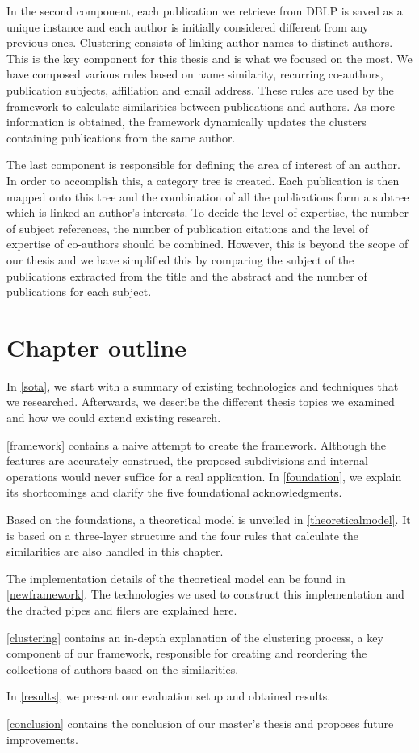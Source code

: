 In the second component, each publication we retrieve from DBLP is saved as a unique instance and each author is initially considered different from any previous ones. Clustering consists of linking author names to distinct authors. This is the key component for this thesis and is what we focused on the most. We have composed various rules based on name similarity, recurring co-authors, publication subjects, affiliation and email address. These rules are used by the framework to calculate similarities between publications and authors. As more information is obtained, the framework dynamically updates the clusters containing publications from the same author.

The last component is responsible for defining the area of interest of an author. In order to accomplish this, a category tree is created. Each publication is then mapped onto this tree and the combination of all the publications form a subtree which is linked an author's interests. To decide the level of expertise, the number of subject references, the number of publication citations and the level of expertise of co-authors should be combined. However, this is beyond the scope of our thesis and we have simplified this by comparing the subject of the publications extracted from the title and the abstract and the number of publications for each subject.

\section{Chapter outline}

In \autoref{sota}, we start with a summary of existing technologies and techniques that we researched. Afterwards, we describe the different thesis topics we examined and how we could extend existing research. 

\autoref{framework} contains a naive attempt to create the framework. Although the features are accurately construed, the proposed subdivisions and internal operations would never suffice for a real application. In \autoref{foundation}, we explain its shortcomings and clarify the five foundational acknowledgments.

Based on the foundations, a theoretical model is unveiled in \autoref{theoreticalmodel}. It is based on a three-layer structure and the four rules that calculate the similarities are also handled in this chapter.

The implementation details of the theoretical model can be found in \autoref{newframework}. The technologies we used to construct this implementation and the drafted pipes and filers are explained here.

\autoref{clustering} contains an in-depth explanation of the clustering process, a key component of our framework, responsible for creating and reordering the collections of authors based on the similarities.

In \autoref{results}, we present our evaluation setup and obtained results.

\autoref{conclusion} contains the conclusion of our master's thesis and proposes future improvements.